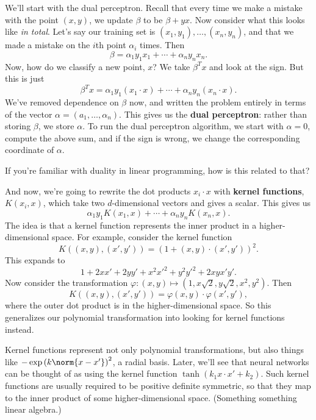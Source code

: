 \documentclass[11pt,paper=letter]{scrartcl}
\begin{document}
We'll start with the dual perceptron. Recall that every time we make a mistake with the point $(x, y)$, we update $\beta$ to be $\beta + yx$. Now consider what this looks like \textit{in total}. Let's say our training set is $(x_1, y_1), \ldots, (x_n, y_n)$, and that we made a mistake on the $i$th point $\alpha_i$ times. Then \[
  \beta = \alpha_1y_1x_1 + \cdots + \alpha_ny_nx_n.
\]
Now, how do we classify a new point, $x$? We take $\beta^Tx$ and look at the sign. But this is just \[
  \beta^Tx = \alpha_1y_1(x_1 \cdot x) + \cdots + \alpha_ny_n(x_n \cdot x).
\]
We've removed dependence on $\beta$ now, and written the problem entirely in terms of the vector $\alpha = (a_1, \ldots, \alpha_n)$. This gives us the \textbf{dual perceptron}: rather than storing $\beta$, we store $\alpha$. To run the dual perceptron algorithm, we start with $\alpha = 0$, compute the above sum, and if the sign is wrong, we change the corresponding coordinate of $\alpha$.
\begin{exrboxed}
  If you're familiar with duality in linear programming, how is this related to that?
\end{exrboxed}

And now, we're going to rewrite the dot products $x_i \cdot x$ with \textbf{kernel functions}, $K(x_i, x)$, which take two $d$-dimensional vectors and gives a scalar. This gives us \[
  \alpha_1y_1K(x_1, x) + \cdots + \alpha_ny_nK(x_n, x).
\]
The idea is that a kernel function represents the inner product in a higher-dimensional space. For example, consider the kernel function \[
  K\left((x, y), (x', y')\right) = \left(1 + (x, y) \cdot (x', y')\right)^2.
\]
This expands to \[
  1 + 2xx' + 2yy' + x^2x'^2 + y^2y'^2 + 2xyx'y'.
\]
Now consider the transformation $\varphi: (x, y) \mapsto (1, x\sqrt{2}, y\sqrt{2}, x^2, y^2)$. Then \[
  K\left((x, y), (x', y')\right) = \varphi(x, y) \cdot \varphi(x', y'),
\]
where the outer dot product is in the higher-dimensional space. So this generalizes our polynomial transformation into looking for kernel functions instead.

Kernel functions represent not only polynomial transformations, but also things like $-\exp\left(k\norm{x - x'}\right)^2$, a radial basis. Later, we'll see that neural networks can be thought of as using the kernel function $\tanh\left(k_1 x \cdot x' + k_2\right)$. Such kernel functions are usually required to be positive definite symmetric, so that they map to the inner product of some higher-dimensional space. (Something something linear algebra.)
\end{document}
